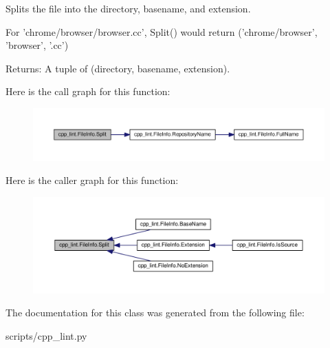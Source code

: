\begin{DoxyVerb}Splits the file into the directory, basename, and extension.

For 'chrome/browser/browser.cc', Split() would
return ('chrome/browser', 'browser', '.cc')

Returns:
  A tuple of (directory, basename, extension).
\end{DoxyVerb}
 Here is the call graph for this function\+:
\nopagebreak
\begin{figure}[H]
\begin{center}
\leavevmode
\includegraphics[width=350pt]{classcpp__lint_1_1_file_info_a0bcdc189921dccc91e7bd9ffad0d57de_cgraph}
\end{center}
\end{figure}
Here is the caller graph for this function\+:
\nopagebreak
\begin{figure}[H]
\begin{center}
\leavevmode
\includegraphics[width=350pt]{classcpp__lint_1_1_file_info_a0bcdc189921dccc91e7bd9ffad0d57de_icgraph}
\end{center}
\end{figure}


The documentation for this class was generated from the following file\+:\begin{DoxyCompactItemize}
\item 
scripts/cpp\+\_\+lint.\+py\end{DoxyCompactItemize}
